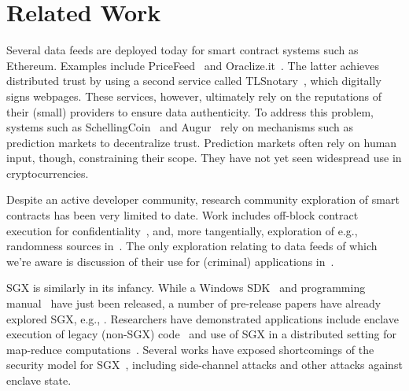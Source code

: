\section{Related Work}
\label{sec:related}

Several data feeds are deployed today for smart contract systems such as Ethereum. Examples include PriceFeed~\cite{PriceFeed:2016} and Oraclize.it~\cite{Oraclize:2016}. The latter achieves distributed trust by using a second service called TLSnotary~\cite{TLSnotary}, which digitally signs webpages. These services, however, ultimately rely on the reputations of their (small) providers to ensure data authenticity.  To address this problem, systems such as SchellingCoin~\cite{schellingcoin} and Augur~\cite{augur} rely on mechanisms such as prediction markets to decentralize trust. Prediction markets often rely on human input, though, constraining their scope. They have not yet seen widespread use in cryptocurrencies. 

Despite an active developer community, research community exploration of smart contracts has been very limited to date. Work includes off-block contract execution for confidentiality~\cite{hawk}, and, more tangentially, exploration of e.g., randomness sources in~\cite{bonneau2015bitcoin}. The only exploration relating to data feeds of which we're aware is discussion of their use for (criminal) applications in~\cite{gyges}.

SGX is similarly in its infancy.
While a Windows SDK~\cite{sgxsdk} and programming manual~\cite{sgxmanual} have just been released, a number of pre-release papers have already explored SGX, e.g., \cite{Baumann:2015:SAU:2818727.2799647,7163017,7163052,anati2013innovative,McKeen:2013jv,Phegade:2013km}. Researchers have demonstrated applications include enclave execution of legacy (non-SGX) code~\cite{Haven} and use of SGX in a distributed setting for map-reduce computations~\cite{VC3}. Several works have exposed shortcomings of the security model for SGX~\cite{sgxexplained,sgxsok,shihardwaretalk}, including side-channel attacks and other attacks against enclave state. 


